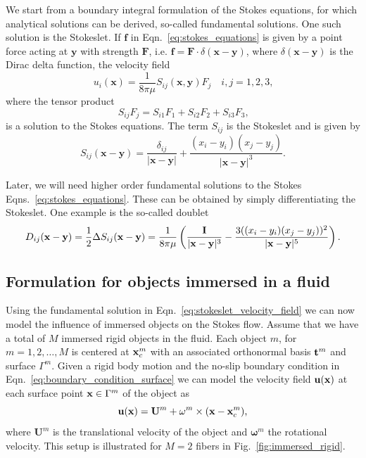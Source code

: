 We start from a boundary integral formulation of the Stokes equations, for which analytical solutions can be derived, so-called fundamental solutions. One such solution is the Stokeslet. If $\mathbf{f}$ in Eqn.~\eqref{eq:stokes_equations} is given by a point force acting at $\mathbf{y}$ with strength $\mathbf{F}$, i.e. $\mathbf{f} = \mathbf{F} \cdot \delta(\mathbf{x} - \mathbf{y})$, where $\delta(\mathbf{x} - \mathbf{y})$ is the Dirac delta function, the velocity field
\begin{equation}
  \label{eq:stokeslet_velocity_field}
  u_i(\mathbf{x}) = \frac{1}{8\pi\mu}S_{ij}(\mathbf{x},\mathbf{y})F_j \quad i,j=1,2,3 \text{,}
\end{equation}
where the tensor product
\begin{equation}
  \label{eq:stokeslet_tensor_product}
  S_{ij}F_j = S_{i1}F_1 + S_{i2}F_2 + S_{i3}F_3 \text{,}
\end{equation}
is a solution to the Stokes equations. The term $S_{ij}$ is the Stokeslet and is given by
\begin{equation}
  \label{eq:stokeslet_stokeslet}
  S_{ij}(\mathbf{x} - \mathbf{y}) = \frac{\delta_{ij}}{|\mathbf{x}-\mathbf{y}|} + \frac{(x_i - y_i)(x_j-y_j)}{|\mathbf{x}-\mathbf{y}|^3}\text{.}
\end{equation}

Later, we will need higher order fundamental solutions to the Stokes Eqns.~\eqref{eq:stokes_equations}. These can be obtained by simply differentiating the Stokeslet. One example is the so-called doublet
\begin{equation}
  \label{eq:doublet}
  D_{ij}(\mathbf{x} - \mathbf{y}) = \frac{1}{2} \Delta S_{ij}(\mathbf{x} - \mathbf{y}) = \frac{1}{8\pi\mu} \left( \frac{\mathbf{I}}{|\mathbf{x} - \mathbf{y}|^3} - \frac{3((x_i - y_i)(x_j-y_j))^2}{|\mathbf{x} - \mathbf{y}|^5}\right) \text{.}
\end{equation}

\subsection{Formulation for objects immersed in a fluid}
\label{subsec:formulation_objects_in_fluid}

Using the fundamental solution in Eqn.~\eqref{eq:stokeslet_velocity_field} we can now model the influence of immersed objects on the Stokes flow. Assume that we have a total of $M$ immersed rigid objects in the fluid. Each object $m$, for $m = 1,2,\dots,M$ is centered at $\mathbf{x}_c^m$ with an associated orthonormal basis $\mathbf{t}^m$ and surface $\Gamma^m$. Given a rigid body motion and the no-slip boundary condition in Eqn.~\eqref{eq:boundary_condition_surface} we can model the velocity field $\mathbf{u}(\mathbf{x})$ at each surface point $\mathbf{x} \in \Gamma^m$ of the object as
\begin{equation}
  \label{eq:rigid_body_motion}
	\mathbf{u}(\mathbf{x}) = \mathbf{U}^m + \mathbf{\omega}^m \times (\mathbf{x} - \mathbf{x}_c^m) \text{,}
\end{equation}
where $\mathbf{U}^m$ is the translational velocity of the object and $\mathbf{\omega}^m$ the rotational velocity. This setup is illustrated for $M=2$ fibers in Fig.~\ref{fig:immersed_rigid}.

